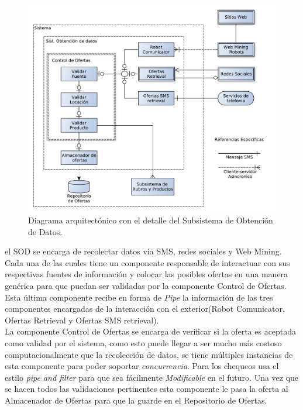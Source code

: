 \begin{figure}[H]
	\centering
	\includegraphics[width=\textwidth]{graficos/arch/Sistema_obtenedor_datos.pdf}
	\caption{Diagrama arquitectónico con el detalle del \textsf{Subsistema de Obtención de Datos}.}
\end{figure}

el SOD se encarga de recolectar datos vía SMS, redes sociales y Web Mining. Cada una de las cuales tiene un componente responsable de interactuar con sus respectivas fuentes de información y colocar las posibles ofertas en una manera genérica para que puedan ser validadas por la componente \textsf{Control de Ofertas}. Esta última componente recibe en forma de \emph{Pipe} la información de las tres componentes encargadas de la interacción con el exterior(\textsf{Robot Comunicator}, \textsf{Ofertas Retrieval} y \textsf{Ofertas SMS retrieval}).\\

La componente \textsf{Control de Ofertas} se encarga de verificar si la oferta es aceptada como validad por el sistema, como esto puede llegar a ser mucho más costoso computacionalmente que la recolección de datos, se tiene múltiples instancias de esta componente para poder soportar \emph{concurrencia}. Para los chequeos usa el estilo \emph{pipe and filter} para que sea fácilmente \emph{Modificable} en el futuro. Una vez que se hacen todos las validaciones pertinentes esta componente le pasa la oferta al \textsf{Almacenador de Ofertas} para que la guarde en el \textsf{Repositorio de Ofertas}.\\


